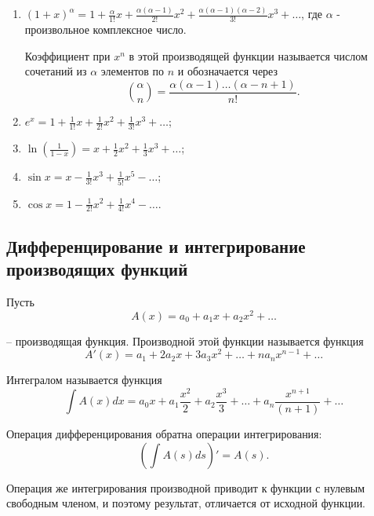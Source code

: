 \documentclass[
russian,
cp1251,
14pt,
simple
]{eskdtext}
\theoremstyle{definition}
\begin{document}
\begin{enumerate}

\item  $\left(1 + x\right)^\alpha = 1 + \frac{\alpha }{1!} x + \frac{\alpha\left(\alpha -1\right)}{2!} x^2 + \frac{\alpha\left(\alpha -1\right)\left(\alpha -2\right)}{3!} x^{3} +\ldots$,
где $\alpha $ - произвольное комплексное число.

Коэффициент при $x^n$ в этой производящей функции называется числом сочетаний из $\alpha$ элементов по $n$ и обозначается через
\begin{equation}
{\alpha \choose n}=\frac{\alpha\left(\alpha - 1\right)\ldots\left(\alpha - n + 1\right)}{n!} .    
\end{equation}

\item  $e^{x} = 1 + \frac{1}{1!} x + \frac{1}{2!} x^2 + \frac{1}{3!} x^3 + \ldots$;

\item  $\ln\left(\frac{1}{1 - x}\right) = x + \frac{1}{2} x^2 + \frac{1}{3} x^3 + \ldots$;       

\item  $\sin x = x-\frac{1}{3!} x^3 + \frac{1}{5!} x^5 - \ldots$;       

\item  $\cos x = 1 - \frac{1}{2!} x^2 + \frac{1}{4!} x^4 - \ldots$.

\end{enumerate}

\subsection{Дифференцирование и интегрирование производящих функций}

Пусть
$$
A\left(x\right) = a_0 + a_1 x + a_2 x^2 +\ldots
$$

-- производящая функция. Производной этой функции называется функция
$$
A'\left(x\right) = a_1 + 2a_2 x + 3a_3 x^2 + \ldots + na_n x^{n-1} + \ldots    
$$

Интегралом называется функция
$$
\int A\left(x\right)dx = a_0 x + a_1 \frac{x^2}{2} + a_2 \frac{x^3}{3} + \ldots + a_n \frac{x^{n+1} }{\left(n + 1\right)} + \ldots
$$

Операция дифференцирования обратна операции интегрирования:
$$
\left(\int A\left(s\right)ds\right)' = A\left(s\right).  
$$

Операция же интегрирования производной приводит к функции с нулевым свободным членом, и поэтому результат, отличается от исходной функции.
\end{document}
